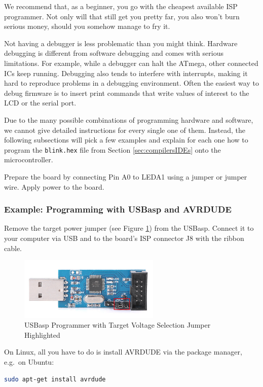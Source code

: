 \documentclass{article}
\newenvironment{note}{\begin{tcolorbox}[colback=blue!5!white,colframe=blue!75!black,title=\textbf{Note}]}{\end{tcolorbox}}
\newcommand{\file}[1]{\texttt{#1}}
\begin{document}
\begin{note}
We recommend that, as a beginner, you go with the cheapest available ISP programmer. Not only will that still get you pretty far, you also won't burn serious money, should you somehow manage to fry it. 

Not having a debugger is less problematic than you might think. Hardware debugging is different from software debugging and comes with serious limitations. For example, while a debugger can halt the ATmega, other connected ICs keep running. Debugging also tends to interfere with interrupts, making it hard to reproduce problems in a debugging environment. Often the easiest way to debug firmware is to insert print commands that write values of interest to the LCD or the serial port. 
\end{note}

Due to the many possible combinations of programming hardware and software, we cannot give detailed instructions for every single one of them. Instead, the following subsections will pick a few examples and explain for each one how to program the \file{blink.hex} file from Section \ref{sec:compilersIDEs} onto the microcontroller. 

Prepare the board by connecting Pin A0 to LEDA1 using a jumper or jumper wire. Apply power to the board.

\subsubsection{Example: Programming with USBasp and AVRDUDE}\label{sec:exUsbaspAvrdude}
Remove the target power jumper (see Figure \ref{fig:usbasp}) from the USBasp. Connect it to your computer via USB and to the board's ISP connector J8 with the ribbon cable. 

\begin{figure}[htb]
\centering
\includegraphics[width=0.6\textwidth]{Pictures/USBasp.png}
\caption{USBasp Programmer with Target Voltage Selection Jumper Highlighted}
\label{fig:usbasp}
\end{figure}

On Linux, all you have to do is install AVRDUDE via the package manager, e.g.\ on Ubuntu:
\begin{lstlisting}[language=bash]
sudo apt-get install avrdude
\end{lstlisting}
\end{document}
